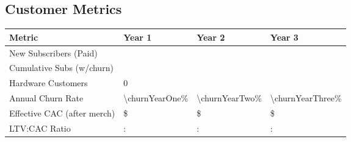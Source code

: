 \subsection{Customer Metrics}
\begin{table}[H]
\centering
\begin{tabularx}{\linewidth}{l Y Y Y}
\toprule
Metric & Year 1 & Year 2 & Year 3 \\\midrule
New Subscribers (Paid) & \numint{\newSubsYearOne} & \numint{\newSubsYearTwo} & \numint{\newSubsYearThree} \\
Cumulative Subs (w/churn) & \numint{\totalSubsYearOne} & \numint{\totalSubsYearTwo} & \numint{\totalSubsYearThree} \\
Hardware Customers & \num{0} & \numint{\hwCustomersYearTwo} & \numint{\hwCustomersYearThree} \\
Annual Churn Rate & \num{\churnYearOne}\% & \num{\churnYearTwo}\% & \num{\churnYearThree}\% \\
Effective CAC (after merch) & \$\numint{\cacDigital - \merchOffsetSubsCalc} & \$\numint{\cacDigital - \merchOffsetSubsCalc} & \$\numint{\cacDigital - \merchOffsetSubsCalc} \\
LTV:CAC Ratio & \numint{\subLTV/(\cacDigital - \merchOffsetSubsCalc)}: & \numint{\subLTV/(\cacDigital - \merchOffsetSubsCalc)}: & \numint{\subLTV/(\cacDigital - \merchOffsetSubsCalc)}: \\
\bottomrule
\end{tabularx}
\end{table}


